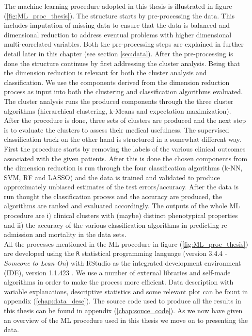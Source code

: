\documentclass[../thesis.tex]{subfiles}
\begin{document}
\indent The machine learning procedure adopted in this thesis is illustrated in figure (\ref{fig:ML_proc_thesis}). The structure starts by pre-processing the data. This includes imputation of missing data to ensure that the data is balanced and dimensional reduction to address eventual problems with higher dimensional multi-correlated variables. Both the pre-processing steps are explained in further detail later in this chapter (see section \ref{sec:data}). After the pre-processing is done the structure continues by first addressing the cluster analysis. Being that the dimension reduction is relevant for both the cluster analysis and classification. We use the components derived from the dimension reduction process as input into both the clustering and classification algorithms evaluated. The cluster analysis runs the produced components through the three cluster algorithms (hierarchical clustering, k-Means and expectation maximization). After the procedure is done, three sets of clusters are produced and the next step is to evaluate the clusters to assess their medical usefulness. The supervised classification track on the other hand is structured in a somewhat different way. First the procedure starts by removing the labels of the various clinical outcomes associated with the given patients. After this is done the chosen components from the dimension reduction is run through the four classification algorithms (k-NN, SVM, RF and LASSO) and the data is trained and validated to produce approximately unbiased estimates of the test errors/accuracy. After the data is run thought the classification process and the accuracy are produced, the algorithms are ranked and evaluated accordingly. The outputs of the whole ML procedure are i) clinical clusters with (maybe) distinct phenotypical properties and ii) the accuracy of the various classification algorithms in predicting re-admission and mortality in the data sets.\\
\indent All the processes mentioned in the ML procedure in figure (\ref{fig:ML_proc_thesis}) are developed using the \texttt{R} statistical programming language (version 3.4.4 - \textit{Someone to Lean On}) \citep{Rsoftware2018} with RStudio as the integrated development environment (IDE), version 1.1.423 \citep{RStudio2018}. We use a number of external libraries and self-made algorithms in order to make the process more efficient. Data description with variable explanations, descriptive statistics and some relevant plot can be fount in appendix (\ref{chap:data_desc}). The source code used to produce all the results in this thesis can be found in appendix (\ref{chap:souce_code}). As we now have given an overview of the ML procedure used in this thesis we move on to presenting the data.
\end{document}
